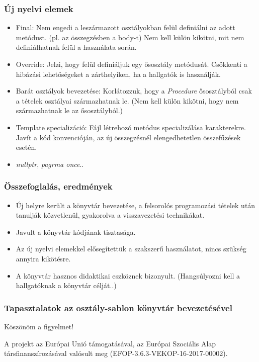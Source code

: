 \documentclass[11pt]{beamer}
\begin{document}
\begin{frame}
	\frametitle{Új nyelvi elemek}
	\begin{itemize}
		\item Final: Nem engedi a leszármazott osztályokban felül definiálni az adott metódust. (pl. az összegzésben a body-t) Nem kell külön kikötni, mit nem definiálhatnak felül a használata során.
		\item Override: Jelzi, hogy felül definiáljuk egy ősosztály metódusát. Csökkenti a hibázási lehetőségeket a zárthelyiken, ha a hallgatók is használják.
		\item Barát osztályok bevezetése: Korlátozzuk, hogy a \textit{Procedure} ősosztályból csak a tételek osztályai származhatnak le. (Nem kell külön kikötni, hogy nem származhatnak le az ősosztályból.)
		\item Template specializáció: Fájl létrehozó metódus specializálása karakterekre. Javít a kód konvencióján, az új összegzésnél elengedhetetlen összefűzések esetén.
		\item \textit{nullptr}, \textit{pagrma once}..
	\end{itemize}
\end{frame}

\begin{frame}
	\frametitle{Összefoglalás, eredmények}
	\begin{itemize}
		\item Új helyre került a könyvtár bevezetése, a felsorolós programozási tételek után tanulják közvetlenül, gyakorolva a visszavezetési technikákat.
		\item Javult a könyvtár kódjának tisztasága.
		\item Az új nyelvi elemekkel elősegítettük a szakszerű használatot, nincs szükség annyira kikötésre.
		\item A könyvtár hasznos didaktikai eszköznek bizonyult. (Hangsúlyozni kell a hallgatóknak a könyvtár célját..)
	\end{itemize}
\end{frame}

\begin{frame}
	\frametitle{Tapasztalatok az osztály-sablon könyvtár bevezetésével}
	\begin{center}
		\Large{Köszönöm a figyelmet!}
	
	\vspace*{25px}
	{\small A projekt az Európai Unió támogatásával, az Európai Szociális Alap társfinanszírozásával valósult meg (EFOP-3.6.3-VEKOP-16-2017-00002).}\end{center}
\end{frame}
\end{document}
